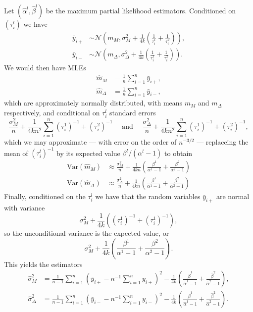 \documentclass[
]{article}
\begin{document}
Let \((\hat\alpha^l,\hat\beta^l)\) be the maximum partial likelihood estimators. Conditioned on \((\tau_i^l)\) we have
\begin{align*}
  \bar{y}_{i+}&\sim \mathcal{N}\left(m_M, \sigma^2_M + \frac{1}{4k}\left( \frac{1}{\tau_i^1}+\frac{1}{\tau_i^2}\right)\right),\\
  \bar{y}_{i-}&\sim \mathcal{N}\left(m_\Delta,\sigma^2_\Delta + \frac{1}{4k}\left( \frac{1}{\tau_i^1}+\frac{1}{\tau_i^2}\right)\right).
\end{align*}
We would then have MLEs
\begin{align*}
  \hat{m}_M&= \frac{1}{n} \sum_{i=1}^n \bar{y}_{i+},\\
  \hat{m}_\Delta&= \frac{1}{n} \sum_{i=1}^n \bar{y}_{i-},
\end{align*}
which are approximately normally distributed, with means \(m_M\) and \(m_\Delta\) respectively, and conditional on \(\tau_i^l\) standard errors
\[
  \frac{\sigma_M^2}{n}+\frac{1}{4kn^2} \sum_{i=1}^n (\tau_i^1)^{-1} + (\tau_i^2)^{-1} \quad \text{ and } \quad
  \frac{\sigma_\Delta^2}{n}+\frac{1}{4kn^2} \sum_{i=1}^n (\tau_i^1)^{-1} + (\tau_i^2)^{-1},
\]
which we may approximate --- with error on the order of \(n^{-3/2}\) --- replaceing the mean of \((\tau_i^l)^{-1}\) by its expected value \(\beta^l/(\alpha^l-1)\) to obtain
\begin{align*}
  \mathrm{Var}(\hat{m}_M) &\approx \frac{\sigma_M^2}{n}+\frac{1}{4kn}\left( \frac{\beta^1}{\alpha^1-1}+ \frac{\beta^2}{\alpha^2-1}\right) \\
  \mathrm{Var}(\hat{m}_\Delta) &\approx \frac{\sigma_\Delta^2}{n}+\frac{1}{4kn}\left( \frac{\beta^1}{\alpha^1-1}+ \frac{\beta^2}{\alpha^2-1}\right) 
\end{align*}
Finally, conditioned on the \(\tau_i^l\) we have that the random variables \(\bar{y}_{i+}\) are normal with variance
\[
  \sigma_M^2+\frac{1}{4k}\left((\tau_i^1)^{-1} + (\tau_i^1)^{-1} \right),
\]
so the unconditional variance is the expected value, or
\[
  \sigma_M^2+\frac{1}{4k}\left(\frac{\beta^1}{\alpha^1-1}+ \frac{\beta^2}{\alpha^2-1} \right).
\]
This yields the estimators
\begin{align*}
  \hat\sigma_M^2 &=\frac{1}{n-1}\sum_{i=1}^n\left(\bar{y}_{i+}-n^{-1}\sum_{i=1}^n y_{i+}\right)^2 - \frac{1}{4k}\left(\frac{\hat\beta^1}{\hat\alpha^1-1}+ \frac{\hat\beta^2}{\hat\alpha^2-1} \right),\\
  \hat\sigma_\Delta^2 &=\frac{1}{n-1}\sum_{i=1}^n\left(\bar{y}_{i-}-n^{-1}\sum_{i=1}^n y_{i-}\right)^2 - \frac{1}{4k}\left(\frac{\hat\beta^1}{\hat\alpha^1-1}+ \frac{\hat\beta^2}{\hat\alpha^2-1} \right).
\end{align*}
\end{document}

